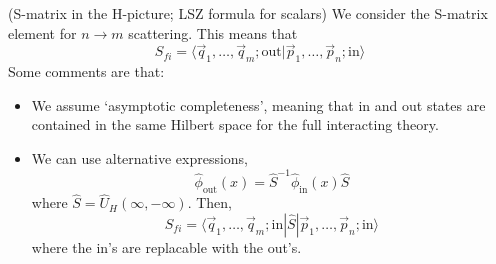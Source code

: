 \begin{defi}
(S-matrix in the H-picture; LSZ formula for scalars) We consider the S-matrix element for $n\rightarrow m$ scattering. This means that
\[S_{fi}=\langle \vec{q}_{1},\ldots ,\vec{q}_{m};\mathrm{out}|\vec{p}_{1},\ldots ,\vec{p}_{n};\mathrm{in}\rangle \]
Some comments are that:
\begin{itemize}
\item[(i)] We assume `asymptotic completeness', meaning that in and out states are contained in the same Hilbert space for the full interacting theory. 
\item[(ii)] We can use alternative expressions,
\[\hat{\phi }_{\mathrm{out}}(x)=\hat{S}^{-1}\hat{\phi }_{\mathrm{in}}(x)\hat{S}\]
where $\hat{S}=\hat{U}_{H}(\infty ,-\infty )$. Then,
\[S_{fi}=\langle \vec{q}_{1},\ldots ,\vec{q}_{m};\mathrm{in}|\hat{S}|\vec{p}_{1},\ldots ,\vec{p}_{n};\mathrm{in}\rangle \]
where the in's are replacable with the out's. 
\end{itemize}
\end{defi}
\vspace{2ex}
